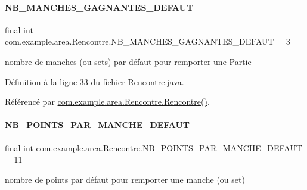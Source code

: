\paragraph{\texorpdfstring{N\+B\+\_\+\+M\+A\+N\+C\+H\+E\+S\+\_\+\+G\+A\+G\+N\+A\+N\+T\+E\+S\+\_\+\+D\+E\+F\+A\+UT}{NB\_MANCHES\_GAGNANTES\_DEFAUT}}
{\footnotesize\ttfamily final int com.\+example.\+area.\+Rencontre.\+N\+B\+\_\+\+M\+A\+N\+C\+H\+E\+S\+\_\+\+G\+A\+G\+N\+A\+N\+T\+E\+S\+\_\+\+D\+E\+F\+A\+UT = 3\hspace{0.3cm}{\ttfamily [static]}}



nombre de manches (ou sets) par défaut pour remporter une \hyperlink{classcom_1_1example_1_1area_1_1_partie}{Partie} 



Définition à la ligne \hyperlink{_rencontre_8java_source_l00033}{33} du fichier \hyperlink{_rencontre_8java_source}{Rencontre.\+java}.



Référencé par \hyperlink{_rencontre_8java_source_l00041}{com.\+example.\+area.\+Rencontre.\+Rencontre()}.

\mbox{\label{classcom_1_1example_1_1area_1_1_rencontre_ac2217d1cf2cf9310966619ba69214259}} 
\paragraph{\texorpdfstring{N\+B\+\_\+\+P\+O\+I\+N\+T\+S\+\_\+\+P\+A\+R\+\_\+\+M\+A\+N\+C\+H\+E\+\_\+\+D\+E\+F\+A\+UT}{NB\_POINTS\_PAR\_MANCHE\_DEFAUT}}
{\footnotesize\ttfamily final int com.\+example.\+area.\+Rencontre.\+N\+B\+\_\+\+P\+O\+I\+N\+T\+S\+\_\+\+P\+A\+R\+\_\+\+M\+A\+N\+C\+H\+E\+\_\+\+D\+E\+F\+A\+UT = 11\hspace{0.3cm}{\ttfamily [static]}}



nombre de points par défaut pour remporter une manche (ou set) 



